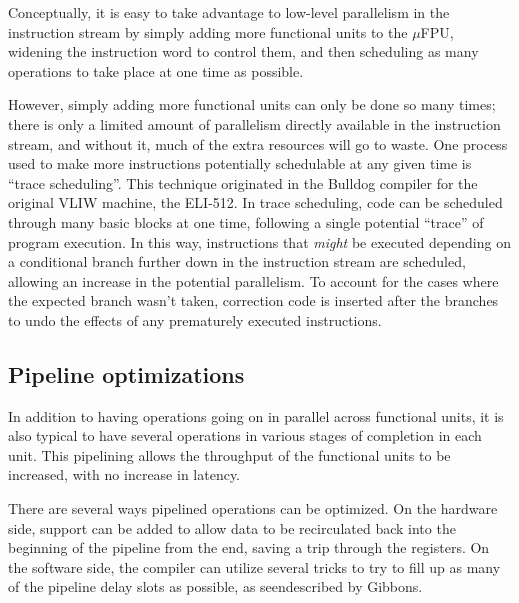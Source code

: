 Conceptually, it is easy to take advantage to low-level parallelism in the
instruction stream by simply adding more functional units to the $\mu$FPU,
widening the instruction word to control them, and then scheduling as many
operations to take place at one time as possible.

However, simply adding more functional units can only be done so many times;
there is only a limited amount of parallelism directly available in the
instruction stream, and without it, much of the extra resources will go to
waste.  One process used to make more instructions potentially schedulable
at any given time is ``trace scheduling''.  This technique originated in the
Bulldog compiler for the original VLIW machine, the ELI-512.
\cite{ellis:bulldog,colwell:vliw}  In trace scheduling, code can be
scheduled through many basic blocks at one time, following a single
potential ``trace'' of program execution.  In this way, instructions that
{\em might\/} be executed depending on a conditional branch further down in
the instruction stream are scheduled, allowing an increase in the potential
parallelism.  To account for the cases where the expected branch wasn't
taken, correction code is inserted after the branches to undo the effects of
any prematurely executed instructions.

\subsection{Pipeline optimizations}

In addition to having operations going on in parallel across functional
units, it is also typical to have several operations in various stages of
completion in each unit.  This pipelining allows the throughput of the
functional units to be increased, with no increase in latency.

There are several ways pipelined operations can be optimized.  On the
hardware side, support can be added to allow data to be recirculated back
into the beginning of the pipeline from the end, saving a trip through the
registers.  On the software side, the compiler can utilize several tricks to
try to fill up as many of the pipeline delay slots as possible, as
seendescribed by Gibbons. \cite{gib86}



